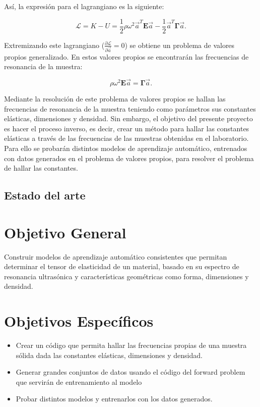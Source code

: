 \documentclass[12pt]{article}
\begin{document}
Así, la expresión para el lagrangiano es la siguiente: 

\begin{equation}
	\mathcal{L} = K - U = \frac{1}{2} \rho \omega^2 \vec{a}^{T}\bm{E}\vec{a} - \frac{1}{2} \vec{a}^{T}\bm{\Gamma}\vec{a}.
\end{equation}

Extremizando este lagrangiano ($\frac{\partial \mathcal{L}}{\partial \vec{a}} = 0$) se obtiene un problema de valores propios generalizado. En estos valores propios se encontrarán las frecuencias de resonancia de la muestra:

\begin{equation}
	\rho \omega^2 \bm{E} \vec{a} = \bm{\Gamma} \vec{a}.
	\label{eq:eigenvalue-problem}
\end{equation}

Mediante la resolución de este problema de valores propios se hallan las frecuencias de resonancia de la muestra teniendo como parámetros sus constantes elásticas, dimensiones y densidad. Sin embargo, el objetivo del presente proyecto es hacer el proceso inverso, es decir, crear un método para hallar las constantes elásticas a través de las frecuencias de las muestras obtenidas en el laboratorio. Para ello se probarán distintos modelos de aprendizaje automático, entrenados con datos generados en el problema de valores propios, para resolver el problema de hallar las constantes. 

\subsection{Estado del arte}

\section{Objetivo General}

Construir modelos de aprendizaje automático consistentes que permitan determinar el tensor de elasticidad de un material, basado en su espectro de resonancia ultrasónica y características geométricas como forma, dimensiones y densidad.
\section{Objetivos Específicos}


\begin{itemize}
	\item Crear un código que permita hallar las frecuencias propias de una muestra sólida dada las constantes elásticas, dimensiones y densidad.
	\item Generar grandes conjuntos de datos usando el código del forward problem que servirán de entrenamiento al modelo
	\item Probar distintos modelos y entrenarlos con los datos generados.
\end{itemize}
\end{document}
